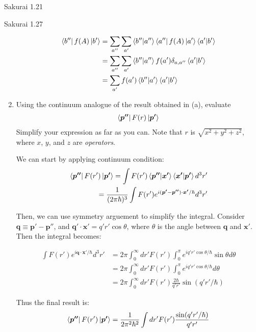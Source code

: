 \documentclass{article}
\begin{document}
\begin{section}{Sakurai 1.21}
\begin{section}{Sakurai 1.27}
\begin{enumerate}
	\begin{tcolorbox}
		\begin{align*}
			\bra{b''}{f(A)}\ket{b'}
			&= \sum_{a''}\sum_{a'} \bra{b''}\ket{a''} \bra{a''}f(A)\ket{a'} \bra{a'}\ket{b'} \\
			&= \sum_{a''}\sum_{a'} \bra{b''}\ket{a''} f(a')\delta_{a,a''} \bra{a'}\ket{b'} \\
			&= \sum_{a'} f(a') \bra{b''}\ket{a'} \bra{a'}\ket{b'} \\
		\end{align*}
	\end{tcolorbox}

	\item Using the continuum analogue of the result obtained in (a), evaluate
	\begin{align*}
		\bra{\boldsymbol{p''}}{F(r)}\ket{\boldsymbol{p'}}
	\end{align*}
	Simplify your expression as far as you can. Note that $r$ is $\sqrt{x^2 + y^2 + z^2}$, where $x$, $y$, and $z$ are {\it operators}.

	\begin{tcolorbox}
		We can start by applying continuum condition:
		\begin{align*}
			\bra{\boldsymbol{p''}}{F(r')}\ket{\boldsymbol{p'}}
			= \int F(r') \bra{\boldsymbol{p''}}\ket{\boldsymbol{x'}} \bra{\boldsymbol{x'}}\ket{\boldsymbol{p'}} d^3r' \\
			= \frac{1}{(2 \pi \hbar)^3} \int F(r') e^{i (\boldsymbol{p'}-\boldsymbol{p''}) \cdot \boldsymbol{x'}/\hbar} d^3r' \\
		\end{align*}

		Then, we can use symmetry arguement to simplify the integral. Consider $\boldsymbol q \equiv \boldsymbol{p'} - \boldsymbol{p''}$, and $\boldsymbol{q'} \cdot \boldsymbol{x'} = q'r' \cos \theta$, where $\theta$ is the angle between $\boldsymbol{q}$ and $\boldsymbol{x'}$. Then the integral becomes:

		\begin{align*}
			\int F(r') e^{i \boldsymbol{q} \cdot \boldsymbol{x'}/\hbar} d^3r' 
			 &=  2\pi \int_0^\infty dr'F(r') \int_0^\pi e^{i q'r' \cos \theta /\hbar } \sin \theta d \theta \\
			 &= 2\pi \int_0^\infty dr'F(r') \int_0^\pi e^{i q'r' \cos \theta /\hbar } d \theta \\
			 &= 2\pi \int_0^\infty dr'F(r') \frac{2\hbar}{q'r'} \sin{(q'r'/\hbar)}
		\end{align*}

		Thus the final result is:
		\begin{align*}
			\bra{\boldsymbol{p''}}{F(r')}\ket{\boldsymbol{p'}}
			 = \frac{1}{2 \pi^2 \hbar^2} \int dr' F(r') \frac{\sin(q'r'/\hbar)}{q' r'}
		\end{align*}
	\end{tcolorbox}
\end{enumerate}

\end{section}{}
\end{section}
\end{document}
